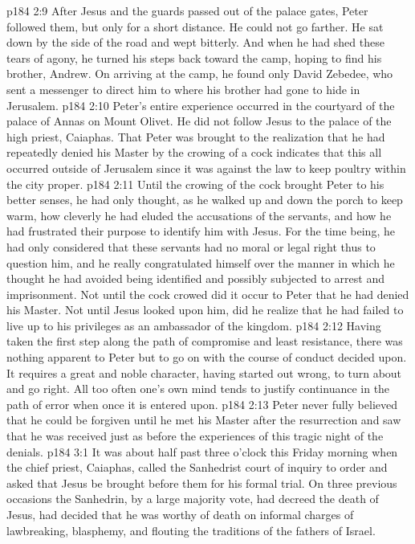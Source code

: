 \vs p184 2:9 After Jesus and the guards passed out of the palace gates, Peter followed them, but only for a short distance. He could not go farther. He sat down by the side of the road and wept bitterly. And when he had shed these tears of agony, he turned his steps back toward the camp, hoping to find his brother, Andrew. On arriving at the camp, he found only David Zebedee, who sent a messenger to direct him to where his brother had gone to hide in Jerusalem.
\pc \vs p184 2:10 Peter’s entire experience occurred in the courtyard of the palace of Annas on Mount Olivet. He did not follow Jesus to the palace of the high priest, Caiaphas. That Peter was brought to the realization that he had repeatedly denied his Master by the crowing of a cock indicates that this all occurred outside of Jerusalem since it was against the law to keep poultry within the city proper.\plusone
\pc \vs p184 2:11 Until the crowing of the cock brought Peter to his better senses, he had only thought, as he walked up and down the porch to keep warm, how cleverly he had eluded the accusations of the servants, and how he had frustrated their purpose to identify him with Jesus. For the time being, he had only considered that these servants had no moral or legal right thus to question him, and he really congratulated himself over the manner in which he thought he had avoided being identified and possibly subjected to arrest and imprisonment. Not until the cock crowed did it occur to Peter that he had denied his Master. Not until Jesus looked upon him, did he realize that he had failed to live up to his privileges as an ambassador of the kingdom.
\vs p184 2:12 Having taken the first step along the path of compromise and least resistance, there was nothing apparent to Peter but to go on with the course of conduct decided upon. It requires a great and noble character, having started out wrong, to turn about and go right. All too often one’s own mind tends to justify continuance in the path of error when once it is entered upon.
\vs p184 2:13 Peter never fully believed that he could be forgiven until he met his Master after the resurrection and saw that he was received just as before the experiences of this tragic night of the denials.
\vs p184 3:1 It was about half past three o’clock this Friday morning when the chief priest, Caiaphas, called the Sanhedrist court of inquiry to order and asked that Jesus be brought before them for his formal trial. On three previous occasions the Sanhedrin, by a large majority vote, had decreed the death of Jesus, had decided that he was worthy of death on informal charges of lawbreaking, blasphemy, and flouting the traditions of the fathers of Israel.
